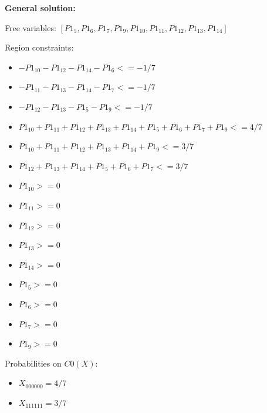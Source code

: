 \documentclass[11pt]{article}
\begin{document}
\noindent\textbf{General solution:}

Free variables: $[P1_5, P1_6, P1_7, P1_9, P1_{10}, P1_{11}, P1_{12}, P1_{13}, P1_{14}]$

Region constraints:
\begin{itemize}
    \item $-P1_{10} - P1_{12} - P1_{14} - P1_6 <= -1/7$
    \item $-P1_{11} - P1_{13} - P1_{14} - P1_7 <= -1/7$
    \item $-P1_{12} - P1_{13} - P1_5 - P1_9 <= -1/7$
    \item $P1_{10} + P1_{11} + P1_{12} + P1_{13} + P1_{14} + P1_5 + P1_6 + P1_7 + P1_9 <= 4/7$
    \item $P1_{10} + P1_{11} + P1_{12} + P1_{13} + P1_{14} + P1_9 <= 3/7$
    \item $P1_{12} + P1_{13} + P1_{14} + P1_5 + P1_6 + P1_7 <= 3/7$
    \item $P1_{10} >= 0$
    \item $P1_{11} >= 0$
    \item $P1_{12} >= 0$
    \item $P1_{13} >= 0$
    \item $P1_{14} >= 0$
    \item $P1_5 >= 0$
    \item $P1_6 >= 0$
    \item $P1_7 >= 0$
    \item $P1_9 >= 0$
\end{itemize}

Probabilities on $C0 (X)$:
\begin{itemize}
    \item $X_{000000} = 4/7$
    \item $X_{111111} = 3/7$
\end{itemize}
\end{document}
